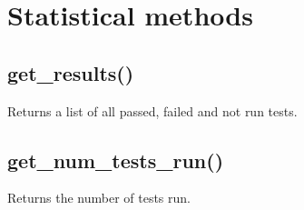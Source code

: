 \documentclass[letterpaper,10pt,english]{sphinxmanual}
\begin{document}
\section{Statistical methods}
\label{\detokenize{api:statistical-methods}}

\subsection{get\_results()}
\label{\detokenize{api:get-results}}
\sphinxAtStartPar
Returns a list of all passed, failed and not run tests.

\begin{sphinxVerbatim}[commandchars=\\\{\}]
\end{sphinxVerbatim}

\sphinxAtStartPar
{}

\begin{sphinxVerbatim}[commandchars=\\\{\}]
  

  \PYG{p}{[}\PYG{p}{]}
  \PYG{p}{[}\PYG{p}{]}
  \PYG{p}{[}\PYG{p}{]}
\end{sphinxVerbatim}

\begin{sphinxVerbatim}[commandchars=\\\{\}]
    
\end{sphinxVerbatim}


\subsection{get\_num\_tests\_run()}
\label{\detokenize{api:get-num-tests-run}}
\sphinxAtStartPar
Returns the number of tests run.

\begin{sphinxVerbatim}[commandchars=\\\{\}]
\end{sphinxVerbatim}
\end{document}
